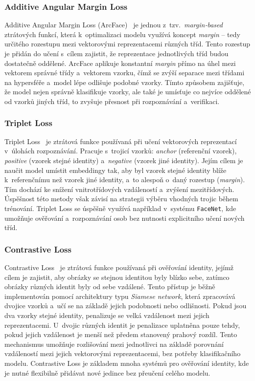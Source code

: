 \subsubsection*{Additive Angular Margin Loss}
 Additive Angular Margin Loss (ArcFace)~\cite{lossMetrics} je jednou z~tzv.~\textit{margin‑based} ztrátových funkcí, která k~optimalizaci modelu využívá koncept \textit{margin} -- tedy určitého rozestupu mezi vektorovými reprezentacemi různých tříd. Tento rozestup je přidán do učení s~cílem zajistit, že reprezentace jednotlivých tříd budou dostatečně oddělené. ArcFace aplikuje konstantní \textit{margin} přímo na úhel mezi vektorem správné třídy a~vektorem vzorku, čímž se zvýší separace mezi třídami na hypersféře a~model lépe odlišuje podobné vzorky. Tímto způsobem zajišťuje, že model nejen správně klasifikuje vzorky, ale také je umísťuje co nejvíce oddělené od vzorků jiných tříd, to zvyšuje přesnost při rozpoznávání a~verifikaci. 

\subsubsection*{Triplet Loss}
\label{tripletLoss}
Triplet Loss~\cite{lossMetrics} je ztrátová funkce používaná při učení vektorových reprezentací v~úlohách rozpoznávání. Pracuje s~trojicí vzorků: \textit{anchor} (referenční vzorek), \textit{positive} (vzorek stejné identity) a~\textit{negative} (vzorek jiné identity). Jejím cílem je naučit model umístit embeddingy tak, aby byl vzorek stejné identity blíže k~referenčnímu než vzorek jiné identity, a~to alespoň o~daný rozestup (\textit{margin}). Tím dochází ke snížení vnitrotřídových vzdáleností a~zvýšení mezitřídových. Úspěšnost této metody však závisí na strategii výběru vhodných trojic během trénování. Triplet Loss se úspěšně využívá například v~systému \texttt{FaceNet}, kde umožňuje ověřování a~rozpoznávání osob bez nutnosti explicitního učení nových tříd.

\subsubsection*{Contrastive Loss}
Contrastive Loss~\cite{lossMetrics} je ztrátová funkce používaná při ověřování identity, jejímž cílem je zajistit, aby obrázky se stejnou identitou byly blízko sebe, zatímco obrázky různých identit byly od sebe vzdálené. Tento přístup je běžně implementován pomocí architektury typu \textit{Siamese network}, která zpracovává dvojice vzorků a~učí se na základě jejich podobnosti nebo odlišnosti. Pokud jsou dva vzorky stejné identity, penalizuje se velká vzdálenost mezi jejich reprezentacemi. U~dvojic různých identit je penalizace uplatněna pouze tehdy, pokud jejich vzdálenost je menší než předem stanovený prahový rozdíl. Tento mechanismus umožňuje rozlišování mezi jednotlivci na základě porovnání vzdáleností mezi jejich vektorovými reprezentacemi, bez potřeby klasifikačního modelu. Contrastive Loss je základem mnoha systémů pro ověřování identity, kde je nutné flexibilně přidávat nové jedince bez přeučení celého modelu.


